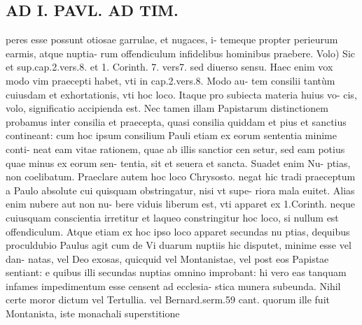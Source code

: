 \documentclass{article}
\begin{document}
\begin{pages}
\section*{AD I. PAVL. AD TIM. }
\marginpar{[ p.Ayo ]}\pstart peres esse possunt otiosae garrulae, et nugaces, i- temeque propter perieurum earmis, atque nuptia- rum offendiculum infidelibus hominibus praebere.  \pend\pstart Volo) Sic et sup.cap.2.vers.8. et 1. Corinth. 7. vers7. sed diuerso sensu. Haec enim vox modo vim praecepti habet, vti in cap.2.vers.8. Modo au- tem consilii tantùm cuiusdam et exhortationis, vti hoc loco. Itaque pro subiecta materia huius vo- cis, volo, significatio accipienda est. Nec tamen illam Papistarum distinctionem probamus inter consilia et praecepta, quasi consilia quiddam et pius et sanctius contineant: cum hoc ipsum consilium Pauli etiam ex eorum sententia minime conti- neat eam vitae rationem, quae ab illis sanctior cen setur, sed eam potius quae minus ex eorum sen- tentia, sit et seuera et sancta. Suadet enim Nu- ptias, non coelibatum. Praeclare autem hoc loco Chrysosto. negat hic tradi praeceptum a Paulo absolute cui quisquam obstringatur, nisi vt supe- riora mala euitet. Alias enim nubere aut non nu- bere viduis liberum est, vti apparet ex 1.Corinth. neque  cuiusquam conscientia irretitur et laqueo constringitur hoc loco, si nullum est offendiculum. Atque etiam ex hoc ipso loco apparet secundas nu ptias, dequibus proculdubio Paulus agit cum de Vi duarum nuptiis hic disputet, minime esse vel dan- natas, vel Deo exosas, quicquid vel Montanistae, vel post eos Papistae sentiant: e quibus illi secundas nuptias omnino improbant: hi vero eas tanquam infames impedimentum esse censent ad ecclesia- stica munera subeunda. Nihil certe moror dictum vel Tertullia. vel Bernard.serm.59 cant. quorum ille fuit Montanista, iste monachali superstitione  \pend

\end{pages}
\end{document}
